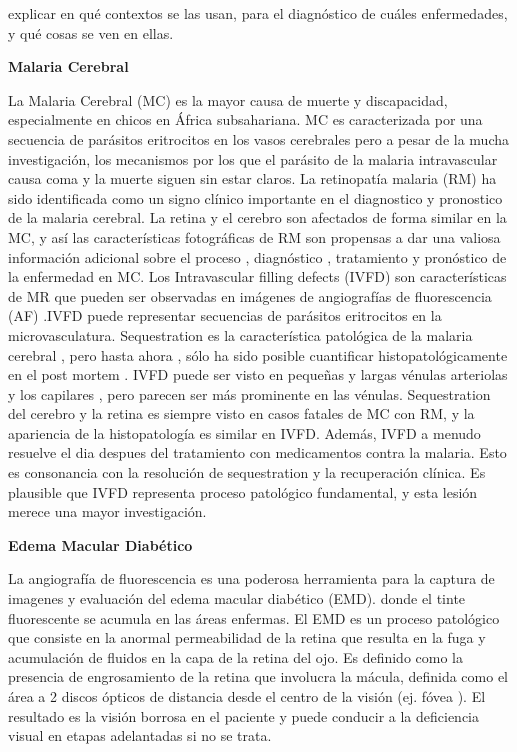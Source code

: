 explicar en qué contextos se las usan, para el diagnóstico de cuáles enfermedades, y qué cosas se ven en ellas.

\textbf{Malaria Cerebral}

La Malaria Cerebral (MC) es la mayor causa de muerte y discapacidad, especialmente en chicos en África subsahariana. MC es caracterizada por una secuencia de parásitos eritrocitos
en los vasos cerebrales pero a pesar de la mucha  investigación, los mecanismos por los que el parásito de la malaria intravascular causa coma y la muerte siguen sin estar claros.
La retinopatía  malaria (RM) ha sido identificada como un signo clínico importante en el diagnostico y pronostico de la malaria cerebral. La retina y el cerebro son afectados de forma similar en la MC, y así las características fotográficas de RM son propensas a dar una valiosa información adicional sobre el proceso , diagnóstico , tratamiento y pronóstico de la enfermedad en MC.
Los Intravascular filling defects (IVFD) son características de  MR que pueden ser observadas en imágenes de  angiografías de fluorescencia (AF) .IVFD puede representar secuencias de parásitos eritrocitos en la microvasculatura. Sequestration es la característica patológica de la malaria cerebral , pero hasta ahora , sólo ha sido posible cuantificar histopatológicamente en el post mortem . IVFD puede ser visto en pequeñas y largas vénulas arteriolas y los capilares , pero parecen ser más prominente en las vénulas. Sequestration del cerebro y la retina es siempre visto en casos fatales de MC con RM, y la apariencia de la histopatología es similar en IVFD. Además, IVFD a menudo resuelve el dia despues del tratamiento con medicamentos contra la malaria. Esto es consonancia con  la resolución de sequestration y la recuperación clínica. Es plausible que  IVFD representa proceso patológico fundamental, y esta lesión merece una mayor investigación. \cite{zhao2015automated}

\textbf{Edema Macular Diabético}

La angiografía de fluorescencia es una poderosa herramienta para la captura de imagenes y evaluación del edema macular diabético (EMD). donde el tinte fluorescente se acumula en las áreas enfermas.
El EMD es un proceso patológico que consiste en la anormal permeabilidad de la retina que resulta en la fuga y acumulación de fluidos en la capa de la retina del ojo. Es definido como la presencia de engrosamiento de la retina que involucra la mácula, definida como el área a 2 discos ópticos de distancia desde el centro de la visión (ej. fóvea ). El resultado es la visión borrosa en el paciente y puede conducir a la deficiencia visual en etapas adelantadas si no se trata. \cite{el2011segmentation}

